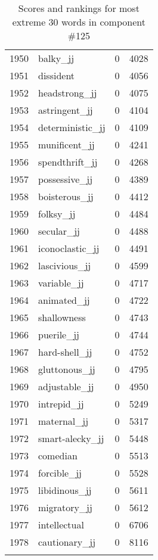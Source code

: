 \begin{longtable}[!htbp]{| rlr@{.}l |}
    1950 & balky\_jj & 0 & 4028 \\
    1951 & dissident & 0 & 4056 \\
    1952 & headstrong\_jj & 0 & 4075 \\
    1953 & astringent\_jj & 0 & 4104 \\
    1954 & deterministic\_jj & 0 & 4109 \\
    1955 & munificent\_jj & 0 & 4241 \\
    1956 & spendthrift\_jj & 0 & 4268 \\
    1957 & possessive\_jj & 0 & 4389 \\
    1958 & boisterous\_jj & 0 & 4412 \\
    1959 & folksy\_jj & 0 & 4484 \\
    1960 & secular\_jj & 0 & 4488 \\
    1961 & iconoclastic\_jj & 0 & 4491 \\
    1962 & lascivious\_jj & 0 & 4599 \\
    1963 & variable\_jj & 0 & 4717 \\
    1964 & animated\_jj & 0 & 4722 \\
    1965 & shallowness & 0 & 4743 \\
    1966 & puerile\_jj & 0 & 4744 \\
    1967 & hard-shell\_jj & 0 & 4752 \\
    1968 & gluttonous\_jj & 0 & 4795 \\
    1969 & adjustable\_jj & 0 & 4950 \\
    1970 & intrepid\_jj & 0 & 5249 \\
    1971 & maternal\_jj & 0 & 5317 \\
    1972 & smart-alecky\_jj & 0 & 5448 \\
    1973 & comedian & 0 & 5513 \\
    1974 & forcible\_jj & 0 & 5528 \\
    1975 & libidinous\_jj & 0 & 5611 \\
    1976 & migratory\_jj & 0 & 5612 \\
    1977 & intellectual & 0 & 6706 \\
    1978 & cautionary\_jj & 0 & 8116 \\
    \hline
    \caption{Scores and rankings for most extreme 30 words in component \#125} \\
\end{longtable}
